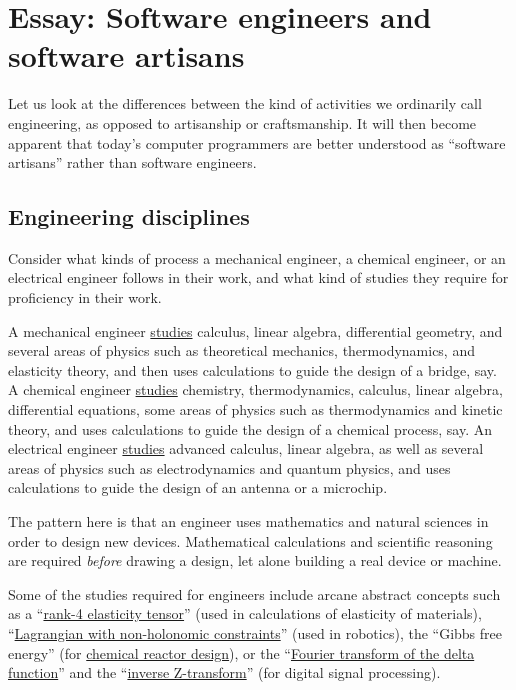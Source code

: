 
\chapter{Essay: Software engineers and software artisans}

Let us look at the differences between the kind of activities we ordinarily
call engineering, as opposed to artisanship or craftsmanship. It will
then become apparent that today's computer programmers are better
understood as ``software artisans'' rather than software engineers.

\section{Engineering disciplines }

Consider what kinds of process a mechanical engineer, a chemical engineer,
or an electrical engineer follows in their work, and what kind of
studies they require for proficiency in their work.

A mechanical engineer \href{https://www.colorado.edu/mechanical/undergraduate-students/curriculum}{studies}
calculus, linear algebra, differential geometry, and several areas
of physics such as theoretical mechanics, thermodynamics, and elasticity
theory, and then uses calculations to guide the design of a bridge,
say. A chemical engineer \href{https://www.colorado.edu/engineering/sample-undergraduate-curriculum-chemical}{studies}
chemistry, thermodynamics, calculus, linear algebra, differential
equations, some areas of physics such as thermodynamics and kinetic
theory, and uses calculations to guide the design of a chemical process,
say. An electrical engineer \href{https://seas.yale.edu/departments/electrical-engineering/undergraduate-study/undergraduate-curriculum-information}{studies}
advanced calculus, linear algebra, as well as several areas of physics
such as electrodynamics and quantum physics, and uses calculations
to guide the design of an antenna or a microchip.

The pattern here is that an engineer uses mathematics and natural
sciences in order to design new devices. Mathematical calculations
and scientific reasoning are required \emph{before} drawing a design,
let alone building a real device or machine.

Some of the studies required for engineers include arcane abstract
concepts such as a ``\href{https://serc.carleton.edu/NAGTWorkshops/mineralogy/mineral_physics/tensors.html}{rank-4 elasticity tensor}''
(used in calculations of elasticity of materials), ``\href{https://arxiv.org/abs/math/0008147}{Lagrangian with non-holonomic constraints}''
(used in robotics), the ``Gibbs free energy'' (for \href{https://www.amazon.com/Introduction-Chemical-Engineering-Kinetics-Reactor/dp/1118368258}{chemical reactor design}),
or the ``\href{https://www.youtube.com/watch\%3Fv\%3DKAbqISZ6SHQ}{Fourier transform of the delta function}''
and the ``\href{https://ocw.mit.edu/resources/res-6-008-digital-signal-processing-spring-2011/video-lectures/lecture-6-the-inverse-z-transform/}{inverse Z-transform}''
(for digital signal processing).

